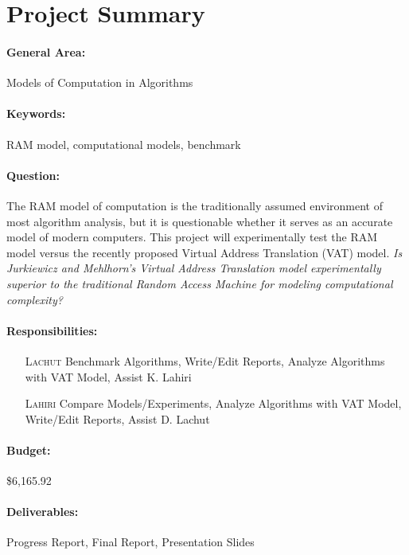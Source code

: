 \maketitle

\section{Project Summary}

\paragraph{General Area:} Models of Computation in Algorithms

\paragraph{Keywords:} RAM model, computational models, benchmark

\paragraph{Question:} The RAM model of computation is the traditionally
assumed environment of most algorithm analysis, but it is questionable whether
it serves as an accurate model of modern computers. This project will
experimentally test the RAM model versus the recently proposed Virtual Address
Translation (VAT) model.
\emph{Is Jurkiewicz and Mehlhorn's Virtual Address Translation model
experimentally superior to the traditional Random Access Machine for modeling
computational complexity?}

\paragraph{Responsibilities:}
  \begin{itemize}
    \item[\textsc{Lachut}] Benchmark Algorithms, Write/Edit Reports, Analyze
    Algorithms with VAT Model, Assist K. Lahiri
    \item[\textsc{Lahiri}] Compare Models/Experiments, Analyze Algorithms with
    VAT Model, Write/Edit Reports, Assist D. Lachut
  \end{itemize}

\paragraph{Budget:} \$6,165.92

\paragraph{Deliverables:} Progress Report, Final Report, Presentation Slides